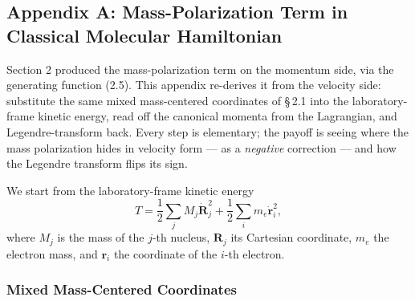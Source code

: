 \subsection*{Appendix A: Mass-Polarization Term in Classical Molecular Hamiltonian}

Section 2 produced the mass-polarization term on the momentum side, via the generating function (2.5). This appendix re-derives it from the velocity side: substitute the same mixed mass-centered coordinates of \S\,2.1 into the laboratory-frame kinetic energy, read off the canonical momenta from the Lagrangian, and Legendre-transform back. Every step is elementary; the payoff is seeing where the mass polarization hides in velocity form --- as a \emph{negative} correction --- and how the Legendre transform flips its sign.

We start from the laboratory-frame kinetic energy
\begin{equation}
T = \frac{1}{2}\sum_j M_j \dot{\mathbf R}_j^2 + \frac{1}{2}\sum_i m_e \dot{\mathbf r}_i^2 , \tag{A.1}
\end{equation}
where $M_j$ is the mass of the $j$-th nucleus, $\mathbf R_j$ its Cartesian coordinate, $m_e$ the electron mass, and $\mathbf r_i$ the coordinate of the $i$-th electron.

\subsubsection*{Mixed Mass-Centered Coordinates}

